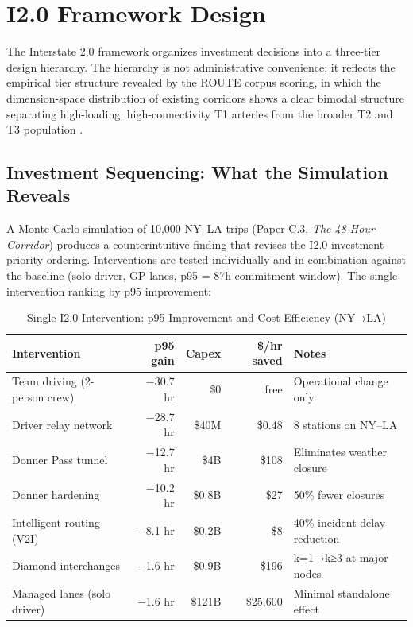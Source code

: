 \section{I2.0 Framework Design}

The Interstate 2.0 framework organizes investment decisions into a three-tier design hierarchy. The hierarchy is not administrative convenience; it reflects the empirical tier structure revealed by the ROUTE corpus scoring, in which the dimension-space distribution of existing corridors shows a clear bimodal structure separating high-loading, high-connectivity T1 arteries from the broader T2 and T3 population \citep{ROUTE_A1,ROUTE_A2}.

\subsection{Investment Sequencing: What the Simulation Reveals}

A Monte Carlo simulation of 10{,}000 NY--LA trips (Paper C.3, \textit{The 48-Hour Corridor}) produces a counterintuitive finding that revises the I2.0 investment priority ordering. Interventions are tested individually and in combination against the baseline (solo driver, GP lanes, p95 = 87h commitment window). The single-intervention ranking by p95 improvement:

\begin{table}[h!]
\centering
\caption{Single I2.0 Intervention: p95 Improvement and Cost Efficiency (NY→LA)}
\label{tab:intervention-rank}
\begin{tabular}{lrrrl}
\toprule
\textbf{Intervention} & \textbf{p95 gain} & \textbf{Capex} & \textbf{\$/hr saved} & \textbf{Notes} \\
\midrule
Team driving (2-person crew) & $-$30.7 hr & \$0 & free & Operational change only \\
Driver relay network & $-$28.7 hr & \$40M & \$0.48 & 8 stations on NY--LA \\
Donner Pass tunnel & $-$12.7 hr & \$4B & \$108 & Eliminates weather closure \\
Donner hardening & $-$10.2 hr & \$0.8B & \$27 & 50\% fewer closures \\
Intelligent routing (V2I) & $-$8.1 hr & \$0.2B & \$8 & 40\% incident delay reduction \\
Diamond interchanges & $-$1.6 hr & \$0.9B & \$196 & k=1→k≥3 at major nodes \\
Managed lanes (solo driver) & $-$1.6 hr & \$121B & \$25{,}600 & Minimal standalone effect \\
\bottomrule
\end{tabular}
\end{table}

